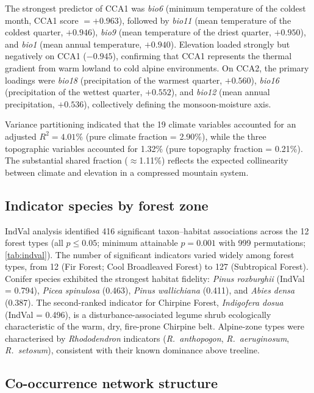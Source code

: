 \documentclass[review,12pt,a4paper]{elsarticle}
\begin{document}
The strongest predictor of CCA1 was \textit{bio6} (minimum temperature of the
coldest month, CCA1 score $= +0.963$), followed by \textit{bio11} (mean
temperature of the coldest quarter, $+0.946$), \textit{bio9} (mean
temperature of the driest quarter, $+0.950$), and \textit{bio1} (mean annual
temperature, $+0.940$). Elevation loaded strongly but negatively on CCA1
($-0.945$), confirming that CCA1 represents the thermal gradient from warm
lowland to cold alpine environments. On CCA2, the primary loadings were
\textit{bio18} (precipitation of the warmest quarter, $+0.560$), \textit{bio16}
(precipitation of the wettest quarter, $+0.552$), and \textit{bio12} (mean
annual precipitation, $+0.536$), collectively defining the monsoon-moisture
axis.

Variance partitioning \citep{borcard1992} indicated that the 19 climate
variables accounted for an adjusted $R^2 = 4.01\%$ (pure climate
fraction = 2.90\%), while the three topographic variables accounted for 1.32\%
(pure topography fraction = 0.21\%). The substantial shared fraction
($\approx$1.11\%) reflects the expected collinearity between climate and
elevation in a compressed mountain system.

\subsection{Indicator species by forest zone}
\label{sec:res_indicator}

IndVal analysis identified 416 significant taxon--habitat associations across
the 12 forest types (all $p \leq 0.05$; minimum attainable $p = 0.001$ with
999 permutations; \cref{tab:indval}). The number of significant indicators
varied widely among forest types, from 12 (Fir Forest; Cool Broadleaved
Forest) to 127 (Subtropical Forest). Conifer species exhibited the strongest
habitat fidelity: \textit{Pinus roxburghii} (IndVal = 0.794),
\textit{Picea spinulosa} (0.463), \textit{Pinus wallichiana} (0.411), and
\textit{Abies densa} (0.387). The second-ranked indicator for Chirpine
Forest, \textit{Indigofera dosua} (IndVal = 0.496), is a disturbance-associated
legume shrub ecologically characteristic of the warm, dry, fire-prone
Chirpine belt. Alpine-zone types were characterised by \textit{Rhododendron}
indicators (\textit{R.\ anthopogon}, \textit{R.\ aeruginosum},
\textit{R.\ setosum}), consistent with their known dominance above treeline.

\subsection{Co-occurrence network structure}
\label{sec:res_network}
\end{document}
